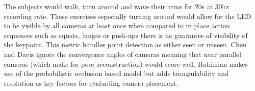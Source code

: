 The subjects would walk, turn around and wave their arms for 20s at 30hz recording rate.
These exercises especially turning around would allow for the LED to be visible by all cameras at least once when compared to in place action sequences such as squats, lunges or push-ups there is no guarantee of visibility of the keypoint.
This metric handles point detection as either seen or unseen.
Chen and Davis ignore the convergence angles of cameras meaning that near parallel cameras (which make for poor reconstruction) would score well. Rahimian makes use of the probabilistic occlusion based model but adds triangulability and resolution as key factors for evaluating camera placement.


